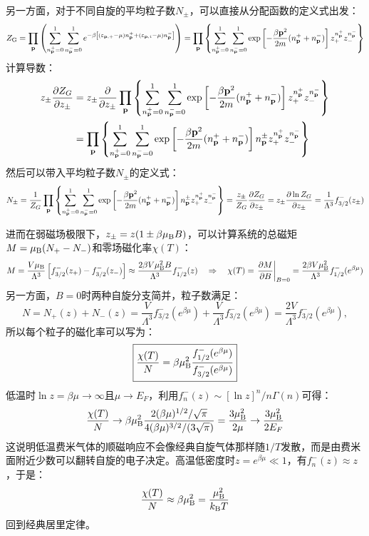 另一方面，对于不同自旋的平均粒子数$N_\pm$，可以直接从分配函数的定义式出发：
\[Z_{\rm G}=\prod_{\mathbf{p}}\left(\sum_{n_{\mathbf{p}}^+=0}^1\sum_{n_{\mathbf{p}}^-=0}^1e^{-\beta\left[(\varepsilon_{\mathbf{p},+}-\mu)n_{\mathbf{p}}^++(\varepsilon_{\mathbf{p},i}-\mu)n_{\mathbf{p}}^-\right]}\right)=\prod_{\mathbf{p}}\left\{\sum_{n_{\mathbf{p}}^+=0}^1\sum_{n_{\mathbf{p}}^-=0}^1\exp\left[-\frac{\beta\mathbf{p}^2}{2m}(n_{\mathbf{p}}^++n_{\mathbf{p}}^-)\right]z_+^{n_{\mathbf{p}}^+}z_-^{n_{\mathbf{p}}^-}\right\}\]
计算导数：
\[\begin{aligned}
z_{\pm}\pdv{Z_G}{z_{\pm}}&=z_{\pm}\pdv{z_{\pm}}\prod_{\mathbf{p}}\left\{\sum_{n_{\mathbf{p}}^+=0}^1\sum_{n_{\mathbf{p}}^-=0}^1\exp\left[-\frac{\beta\mathbf{p}^2}{2m}(n_{\mathbf{p}}^++n_{\mathbf{p}}^-)\right]z_+^{n_{\mathbf{p}}^+}z_-^{n_{\mathbf{p}}^-}\right\}\\
&=\prod_{\mathbf{p}}\left\{\sum_{n_{\mathbf{p}}^+=0}^1\sum_{n_{\mathbf{p}}^-=0}^1\exp\left[-\frac{\beta\mathbf{p}^2}{2m}(n_{\mathbf{p}}^++n_{\mathbf{p}}^-)\right]n_{\mathbf{p}}^{\pm}z_+^{n_{\mathbf{p}}^+}z_-^{n_{\mathbf{p}}^-}\right\}
\end{aligned}\]
然后可以带入平均粒子数$N_\pm$的定义式：
\[N_{\pm}=\frac{1}{Z_G}\prod_{\mathbf{p}}\left\{\sum_{n_{\mathbf{p}}^+=0}^1\sum_{n_{\mathbf{p}}^-=0}^1\exp\left[-\frac{\beta\mathbf{p}^2}{2m}(n_{\mathbf{p}}^++n_{\mathbf{p}}^-)\right]n_{\mathbf{p}}^{\pm}z_+^{n_{\mathbf{p}}^+}z_-^{n_{\mathbf{p}}^-}\right\}=\frac{z_{\pm}}{Z_G}\pdv{Z_G}{z_{\pm}}=z_{\pm}\pdv{\ln Z_G}{z_{\pm}}=\frac{1}{\Lambda^3}f_{3/2}^-(z_{\pm})\]

进而在弱磁场极限下，$z_\pm=z(1\pm\beta\mu_{\rm B}B)$，可以计算系统的总磁矩$M=\mu_{\rm B}(N_+-N_-)$和零场磁化率$\chi(T)$：
\[M=\frac{V\mu_{\rm B}}{\Lambda^3}\left[f_{3/2}^-(z_+)-f_{3/2}^-(z_-)\right]\approx\frac{2\beta V\mu_{\rm B}^2B}{\Lambda^3}f_{1/2}^-(z) \quad \Rightarrow \quad \chi(T)=\eval{\pdv{M}{B}}_{B=0}=\frac{2\beta V\mu_{\rm B}^2}{\Lambda^3}f_{1/2}^-(e^{\beta\mu})\]
另一方面，$B=0$时两种自旋分支简并，粒子数满足：
\[
N=N_+(z)+N_-(z)=\frac{V}{\Lambda^3}f_{3/2}^-(e^{\beta\mu})+\frac{V}{\Lambda^3}f_{3/2}^-(e^{\beta\mu})=\frac{2V}{\Lambda^3}f_{3/2}^-(e^{\beta\mu}),
\]
所以每个粒子的磁化率可以写为：
\[\boxed{\frac{\chi(T)}{N}=\beta\mu_{\rm B}^2\frac{f_{1/2}^-(e^{\beta\mu})}{f_{3/2}^-(e^{\beta\mu})}}\]
低温时$\ln z=\beta\mu\to\infty$且$\mu\to E_F$，利用$f_n^-(z)\sim[\ln z]^n/n\Gamma(n)$可得：
\[\frac{\chi(T)}{N}\to\beta\mu_{\rm B}^2\frac{2(\beta\mu)^{1/2}/\sqrt{\pi}}{4(\beta\mu)^{3/2}/(3\sqrt{\pi})}=\frac{3\mu_{\rm B}^2}{2\mu}\to\frac{3\mu_{\rm B}^2}{2E_F}\]
这说明低温费米气体的顺磁响应不会像经典自旋气体那样随$1/T$发散，而是由费米面附近少数可以翻转自旋的电子决定。高温低密度时$z=e^{\beta\mu}\ll1$，有$f_n^-(z)\approx z$，于是：
\[\frac{\chi(T)}{N}\approx\beta\mu_{\rm B}^2=\frac{\mu_{\rm B}^2}{k_{\rm B}T}\]
回到经典居里定律。


